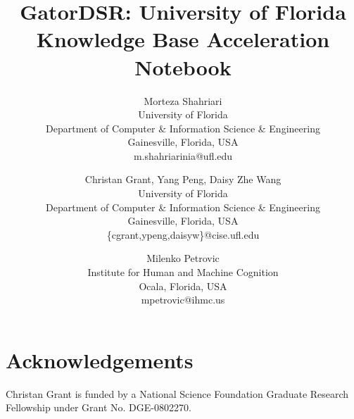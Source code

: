 \documentclass{article}
\begin{document}
\title{GatorDSR: University of Florida Knowledge Base Acceleration Notebook}


\author {%
  Morteza Shahriari\\
  University of Florida\\
  Department of Computer \& Information Science \& Engineering\\
  Gainesville, Florida, USA\\
       {m.shahriarinia@ufl.edu}
\and
  Christan Grant, Yang Peng, Daisy Zhe Wang\\
  University of Florida\\
       Department of Computer \& Information Science \& Engineering\\
       Gainesville, Florida, USA\\
       {\{cgrant,ypeng,daisyw\}@cise.ufl.edu}
\and
  Milenko Petrovic\\
  Institute for Human and Machine Cognition\\
       Ocala, Florida, USA\\
       {mpetrovic@ihmc.us}
}

\maketitle
















\section*{Acknowledgements}
Christan Grant is funded by a National Science Foundation Graduate Research
Fellowship under Grant No. DGE-0802270.



\end{document}
